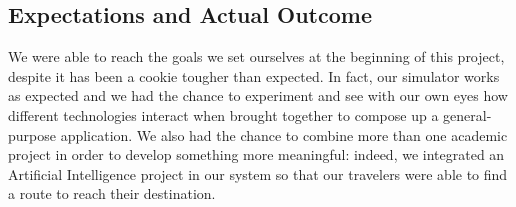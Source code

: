 
\subsection{Expectations and Actual Outcome}

We were able to reach the goals we set ourselves at the beginning of this
project, despite it has been a cookie tougher than expected.
In fact, our simulator works as expected and we had the chance to experiment
and see with our own eyes how different technologies interact when brought
together to compose up a general-purpose application.
We also had the chance to combine more than one academic project in order to
develop something more meaningful: indeed, we integrated an Artificial
Intelligence project in our system so that our travelers were able to find a
route to reach their destination.

